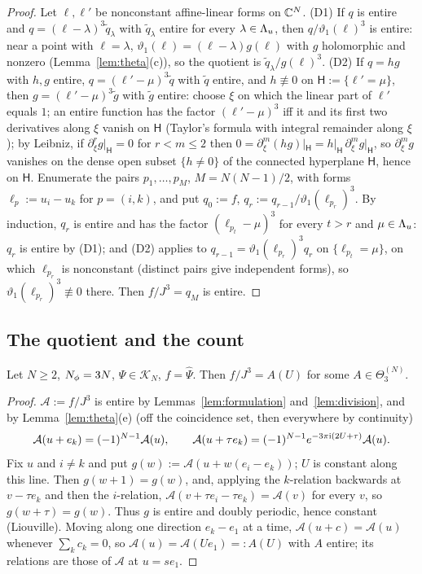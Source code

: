 \begin{proof}
Let $\ell,\ell'$ be nonconstant affine-linear forms on $\mathbb{C}^N$. (D1) If $q$ is entire and $q=(\ell-\lambda)^3\tilde q_\lambda$ with
$\tilde q_\lambda$ entire for every $\lambda\in\Lambda_u$, then $q/\vartheta_1(\ell)^3$ is entire: near a point with $\ell=\lambda$,
$\vartheta_1(\ell)=(\ell-\lambda)g(\ell)$ with $g$ holomorphic and nonzero (Lemma~\ref{lem:theta}(c)), so the quotient is
$\tilde q_\lambda/g(\ell)^3$. (D2) If $q=hg$ with $h,g$ entire, $q=(\ell'-\mu)^3\tilde q$ with $\tilde q$ entire, and $h\not\equiv0$ on
$\mathsf H:=\{\ell'=\mu\}$, then $g=(\ell'-\mu)^3\tilde g$ with $\tilde g$ entire: choose $\xi$ on which the linear part of $\ell'$
equals $1$; an entire function has the factor $(\ell'-\mu)^3$ iff it and its first two derivatives along $\xi$ vanish on $\mathsf H$ (Taylor's formula with integral
remainder along $\xi$); by Leibniz, if $\partial^r_\xi g|_{\mathsf H}=0$ for $r<m\le2$ then
$0=\partial^m_\xi(hg)|_{\mathsf H}=h|_{\mathsf H}\,\partial_\xi^mg|_{\mathsf H}$, so
$\partial^m_\xi g$ vanishes on the dense open subset $\{h\neq0\}$ of the connected hyperplane $\mathsf H$, hence on $\mathsf H$.
Enumerate the pairs $p_1,\dots,p_M$, $M=N(N-1)/2$, with forms $\ell_{p}:=u_i-u_k$ for $p=(i,k)$, and put $q_0:=f$,
$q_r:=q_{r-1}/\vartheta_1(\ell_{p_r})^3$. By induction, $q_r$ is entire and has the factor $(\ell_{p_t}-\mu)^3$ for every $t>r$ and
$\mu\in\Lambda_u$: $q_r$ is entire by (D1); and (D2) applies to $q_{r-1}=\vartheta_1(\ell_{p_r})^3q_r$ on $\{\ell_{p_t}=\mu\}$, on which
$\ell_{p_r}$ is nonconstant (distinct pairs give independent forms), so $\vartheta_1(\ell_{p_r})^3\not\equiv0$ there. Then
$f/J^3=q_M$ is entire.
\end{proof}

\subsection{The quotient and the count}

\begin{lemma}\label{lem:quotient}
Let $N\ge2$, $N_{\phi}=3N$, $\Psi\in\mathcal K_N$, $f=\widehat\Psi$. Then $f/J^3=A(U)$ for some $A\in\Theta_3^{(N)}$.
\end{lemma}

\begin{proof}
$\mathcal A:=f/J^3$ is entire by Lemmas~\ref{lem:formulation} and~\ref{lem:division}, and by Lemma~\ref{lem:theta}(e) (off the
coincidence set, then everywhere by continuity)
\[
\mathcal A(u+e_k)=(-1)^{N-1}\mathcal A(u),\qquad \mathcal A(u+\tau e_k)=(-1)^{N-1}e^{-3\pi\mathrm{i}(2U+\tau)}\mathcal A(u).
\]
Fix $u$ and $i\neq k$ and put $g(w):=\mathcal A(u+w(e_i-e_k))$; $U$ is constant along this line. Then $g(w+1)=g(w)$, and,
applying the $k$-relation backwards at $v-\tau e_k$ and then the $i$-relation, $\mathcal A(v+\tau e_i-\tau e_k)=\mathcal A(v)$ for every $v$, so
$g(w+\tau)=g(w)$. Thus $g$ is entire and doubly periodic, hence constant (Liouville). Moving along one direction
$e_k-e_1$ at a time, $\mathcal A(u+c)=\mathcal A(u)$ whenever $\sum_kc_k=0$, so $\mathcal A(u)=\mathcal A(Ue_1)=:A(U)$ with $A$ entire; its relations are those of
$\mathcal A$ at $u=se_1$.
\end{proof}

